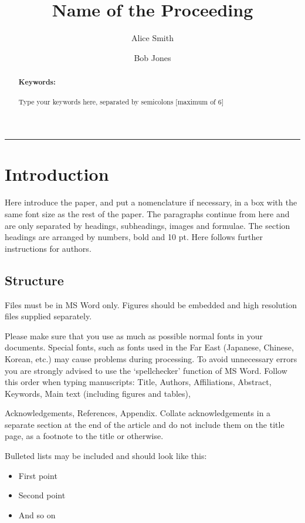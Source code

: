 \documentclass[10pt]{article}
\title{Name of the Proceeding}
\author[1]{Alice Smith}
\author[2]{Bob Jones}
\affil[1]{Department of Mathematics, University X}
\affil[2]{Department of Biology, University Y}
\date{}
\begin{document}
\maketitle

\begin{abstract}
\blindtext

\paragraph*{Keywords:} Type your keywords here, separated by semicolons [maximum of 6]
\end{abstract}

\hrule

\section{Introduction} Here introduce the paper, and put a nomenclature if necessary, in a box with the same font size as the rest of the paper. The paragraphs continue from here and are only separated by headings, subheadings, images and formulae. The section headings are arranged by numbers, bold and 10 pt. Here follows further instructions for authors.


\subsection{Structure}
\indent Files must be in MS Word only. Figures should be embedded and high resolution files supplied separately.

Please make sure that you use as much as possible normal fonts in your documents. Special fonts, such as fonts used in the Far East (Japanese, Chinese, Korean, etc.) may cause problems during processing. To avoid unnecessary errors you are strongly advised to use the ‘spellchecker’ function of MS Word. Follow this order when typing manuscripts: Title, Authors, Affiliations, Abstract, Keywords, Main text (including figures and tables), 

Acknowledgements, References, Appendix. Collate acknowledgements in a separate section at the end of the article and do not include them on the title page, as a footnote to the title or otherwise.

Bulleted lists may be included and should look like this:
\begin{itemize}
    \item First point
    \item Second point 
    \item And so on
\end{itemize}
\end{document}
